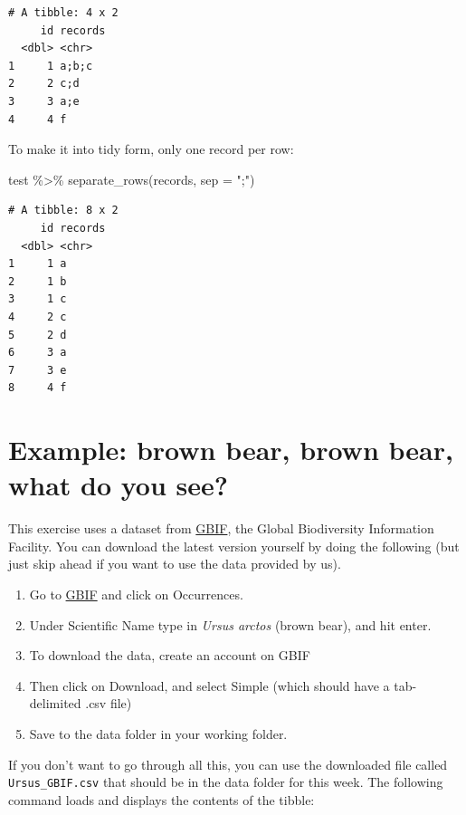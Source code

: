 \documentclass[
  letterpaper,
  DIV=11,
  numbers=noendperiod]{scrreprt}
\newenvironment{Shaded}{\begin{snugshade}}{\end{snugshade}}
\newcommand{\AttributeTok}[1]{\textcolor[rgb]{0.40,0.45,0.13}{#1}}
\newcommand{\FunctionTok}[1]{\textcolor[rgb]{0.28,0.35,0.67}{#1}}
\newcommand{\NormalTok}[1]{\textcolor[rgb]{0.00,0.23,0.31}{#1}}
\newcommand{\SpecialCharTok}[1]{\textcolor[rgb]{0.37,0.37,0.37}{#1}}
\newcommand{\StringTok}[1]{\textcolor[rgb]{0.13,0.47,0.30}{#1}}
\providecommand{\tightlist}{%
  \setlength{\itemsep}{0pt}\setlength{\parskip}{0pt}}\usepackage{longtable,booktabs,array}
\begin{document}
\begin{verbatim}
# A tibble: 4 x 2
     id records
  <dbl> <chr>  
1     1 a;b;c  
2     2 c;d    
3     3 a;e    
4     4 f      
\end{verbatim}

To make it into tidy form, only one record per row:

\begin{Shaded}
\begin{Highlighting}[]
\NormalTok{test }\SpecialCharTok{\%\textgreater{}\%} \FunctionTok{separate\_rows}\NormalTok{(records, }\AttributeTok{sep =} \StringTok{";"}\NormalTok{)}
\end{Highlighting}
\end{Shaded}

\begin{verbatim}
# A tibble: 8 x 2
     id records
  <dbl> <chr>  
1     1 a      
2     1 b      
3     1 c      
4     2 c      
5     2 d      
6     3 a      
7     3 e      
8     4 f      
\end{verbatim}

\hypertarget{example-brown-bear-brown-bear-what-do-you-see}{%
\section{Example: brown bear, brown bear, what do you
see?}\label{example-brown-bear-brown-bear-what-do-you-see}}

This exercise uses a dataset from \href{https://www.gbif.org/en/}{GBIF},
the Global Biodiversity Information Facility. You can download the
latest version yourself by doing the following (but just skip ahead if
you want to use the data provided by us).

\begin{enumerate}
\def\labelenumi{\arabic{enumi}.}
\tightlist
\item
  Go to \href{https://www.gbif.org/en/}{GBIF} and click on Occurrences.
\item
  Under Scientific Name type in \emph{Ursus arctos} (brown bear), and
  hit enter.
\item
  To download the data, create an account on GBIF
\item
  Then click on Download, and select Simple (which should have a
  tab-delimited .csv file)
\item
  Save to the data folder in your working folder.
\end{enumerate}

If you don't want to go through all this, you can use the downloaded
file called \texttt{Ursus\_GBIF.csv} that should be in the data folder
for this week. The following command loads and displays the contents of
the tibble:
\end{document}
